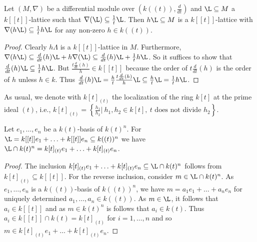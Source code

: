 \documentclass[a4paper, 11pt]{article}
\begin{document}
\begin{lemma} \label{lemma: scaling lattice}
Let $(M,\nabla)$ be a differential module over $(k((t)),\frac{d}{dt})$ and $\L\subseteq M$ a $k[[t]]$-lattice such that $\nabla(\L)\subseteq \frac{1}{t}\L$. Then $h\L\subseteq M$ is a $k[[t]]$-lattice with $\nabla(h\L)\subseteq \frac{1}{t}h\L$
for any non-zero $h\in k((t))$.
\end{lemma}	
\begin{proof}
 Clearly $h\Lambda$ is a $k[[t]]$-lattice in $M$. Furthermore, $\nabla(h \L) \subseteq \frac{d}{dt}(h)\L + h\nabla(\L) \subseteq \frac{d}{dt}(h)\L + \frac{1}{t}h\L $. So it suffices to show that $\frac{d}{dt}(h)\L\subseteq\frac{1}{t}h\L$. But $\frac{t\frac{d}{dt}(h)}{h}\in k[[t]]$ because the order of $t\frac{d}{dt}(h)$ is the order of $h$ unless $h\in k$. Thus $\frac{d}{dt}(h)\L=\frac{h}{t} \frac{t\frac{d}{dt}(h)}{h} \L \subseteq \frac{h}{t} \L=\frac{1}{t}h\L$.
\end{proof}	

As usual, we denote with $k[t]_{(t)}$ the localization of the ring $k[t]$ at the prime ideal $(t)$, i.e., $k[t]_{(t)}=\left\{\frac{h_1}{h_2}|\ h_1,h_2\in k[t],\ t \text{ does not divide } h_2\right\}$.



\begin{lemma} \label{lem:latt}
Let $e_1,\ldots,e_n$ be a $k(t)$-basis of $k(t)^n$. For $\L=k[[t]]e_1+\ldots+k[[t]]e_n\subseteq k((t))^n$ we have $\L\cap k(t)^n=k[t]_{(t)}e_1+\ldots+k[t]_{(t)}e_n$.
\end{lemma}	
\begin{proof}
	The inclusion $k[t]_{(t)}e_1+\ldots+k[t]_{(t)}e_n\subseteq \L\cap k(t)^n$ follows from $k[t]_{(t)}\subseteq k[[t]]$.
	For the reverse inclusion, consider $m\in\L\cap k(t)^n$. As $e_1,\ldots,e_n$ is a $k((t))$-basis of $k((t))^n$, we have $m=a_1e_1+\ldots+a_ne_n$ for uniquely determined $a_1,\ldots,a_n\in k((t))$. As $m\in \L$, it follows that $a_i\in k[[t]]$ and as $m\in k(t)^n$ is follows that $a_i\in k(t)$. Thus $a_i\in k[[t]]\cap k(t)=k[t]_{(t)}$ for $i=1,\ldots,n$ and so $m\in k[t]_{(t)}e_1+\ldots+k[t]_{(t)}e_n$.
\end{proof}	
\end{document}
